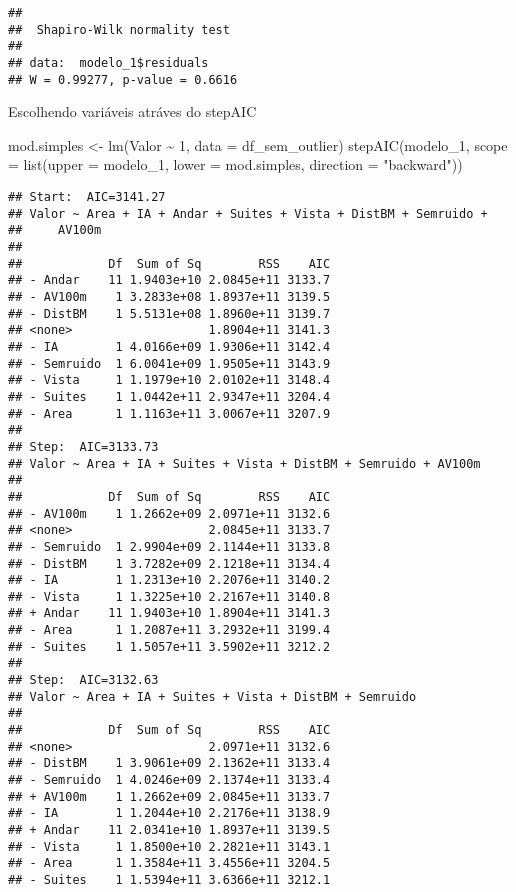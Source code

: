 \documentclass[
]{article}
\newenvironment{Shaded}{\begin{snugshade}}{\end{snugshade}}
\newcommand{\AttributeTok}[1]{\textcolor[rgb]{0.77,0.63,0.00}{#1}}
\newcommand{\DecValTok}[1]{\textcolor[rgb]{0.00,0.00,0.81}{#1}}
\newcommand{\FunctionTok}[1]{\textcolor[rgb]{0.00,0.00,0.00}{#1}}
\newcommand{\NormalTok}[1]{#1}
\newcommand{\OtherTok}[1]{\textcolor[rgb]{0.56,0.35,0.01}{#1}}
\newcommand{\SpecialCharTok}[1]{\textcolor[rgb]{0.00,0.00,0.00}{#1}}
\newcommand{\StringTok}[1]{\textcolor[rgb]{0.31,0.60,0.02}{#1}}
\begin{document}
\begin{verbatim}
## 
##  Shapiro-Wilk normality test
## 
## data:  modelo_1$residuals
## W = 0.99277, p-value = 0.6616
\end{verbatim}

Escolhendo variáveis atráves do stepAIC

\begin{Shaded}
\begin{Highlighting}[]
\NormalTok{mod.simples  }\OtherTok{\textless{}{-}} \FunctionTok{lm}\NormalTok{(Valor }\SpecialCharTok{\textasciitilde{}} \DecValTok{1}\NormalTok{, }\AttributeTok{data =}\NormalTok{ df\_sem\_outlier)}
\FunctionTok{stepAIC}\NormalTok{(modelo\_1, }\AttributeTok{scope =} \FunctionTok{list}\NormalTok{(}\AttributeTok{upper =}\NormalTok{ modelo\_1,}
                               \AttributeTok{lower =}\NormalTok{ mod.simples, }\AttributeTok{direction =} \StringTok{"backward"}\NormalTok{))}
\end{Highlighting}
\end{Shaded}

\begin{verbatim}
## Start:  AIC=3141.27
## Valor ~ Area + IA + Andar + Suites + Vista + DistBM + Semruido + 
##     AV100m
## 
##            Df  Sum of Sq        RSS    AIC
## - Andar    11 1.9403e+10 2.0845e+11 3133.7
## - AV100m    1 3.2833e+08 1.8937e+11 3139.5
## - DistBM    1 5.5131e+08 1.8960e+11 3139.7
## <none>                   1.8904e+11 3141.3
## - IA        1 4.0166e+09 1.9306e+11 3142.4
## - Semruido  1 6.0041e+09 1.9505e+11 3143.9
## - Vista     1 1.1979e+10 2.0102e+11 3148.4
## - Suites    1 1.0442e+11 2.9347e+11 3204.4
## - Area      1 1.1163e+11 3.0067e+11 3207.9
## 
## Step:  AIC=3133.73
## Valor ~ Area + IA + Suites + Vista + DistBM + Semruido + AV100m
## 
##            Df  Sum of Sq        RSS    AIC
## - AV100m    1 1.2662e+09 2.0971e+11 3132.6
## <none>                   2.0845e+11 3133.7
## - Semruido  1 2.9904e+09 2.1144e+11 3133.8
## - DistBM    1 3.7282e+09 2.1218e+11 3134.4
## - IA        1 1.2313e+10 2.2076e+11 3140.2
## - Vista     1 1.3225e+10 2.2167e+11 3140.8
## + Andar    11 1.9403e+10 1.8904e+11 3141.3
## - Area      1 1.2087e+11 3.2932e+11 3199.4
## - Suites    1 1.5057e+11 3.5902e+11 3212.2
## 
## Step:  AIC=3132.63
## Valor ~ Area + IA + Suites + Vista + DistBM + Semruido
## 
##            Df  Sum of Sq        RSS    AIC
## <none>                   2.0971e+11 3132.6
## - DistBM    1 3.9061e+09 2.1362e+11 3133.4
## - Semruido  1 4.0246e+09 2.1374e+11 3133.4
## + AV100m    1 1.2662e+09 2.0845e+11 3133.7
## - IA        1 1.2044e+10 2.2176e+11 3138.9
## + Andar    11 2.0341e+10 1.8937e+11 3139.5
## - Vista     1 1.8500e+10 2.2821e+11 3143.1
## - Area      1 1.3584e+11 3.4556e+11 3204.5
## - Suites    1 1.5394e+11 3.6366e+11 3212.1
\end{verbatim}
\end{document}
